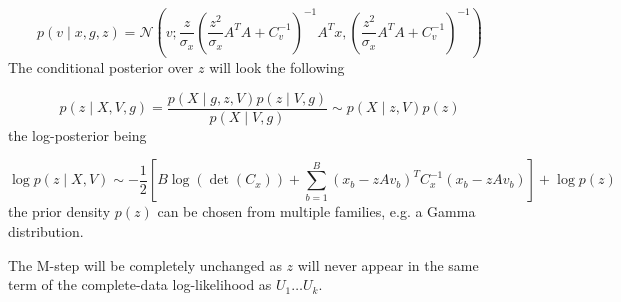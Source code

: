 \documentclass{paper}
\begin{document}
\begin{equation}
p(v \mid x,g,z) = \mathcal{N}\left(v; \frac{z}{ \sigma_x} \left( \frac{z^2}{ \sigma_x} A^T A + C_v^{-1}\right)^{-1} A^T x, \left(\frac{z^2}{\sigma_x} A^T A + C_v^{-1}\right)^{-1}\right)
\end{equation}
%
The conditional posterior over $z$ will look the following

\begin{equation} 
p(z \mid X,V,g) = \frac{p(X \mid g,z,V) p(z \mid V,g)}{p(X \mid V,g)} \sim p(X \mid z,V) p(z)
\end{equation}
% 
the log-posterior being

\begin{equation} 
\log p(z \mid X,V) \sim -\frac{1}{2} \left[B\log(\det(C_x)) + \sum_{b=1}^B (x_b - zAv_b)^T C_x^{-1} (x_b - zAv_b)\right] + \log p(z)
\end{equation}
%
the prior density $p(z)$ can be chosen from multiple families, e.g. a Gamma distribution.

The M-step will be completely unchanged as $z$ will never appear in the same term of the complete-data log-likelihood as $U_1 \dots U_k$.
\end{document}
